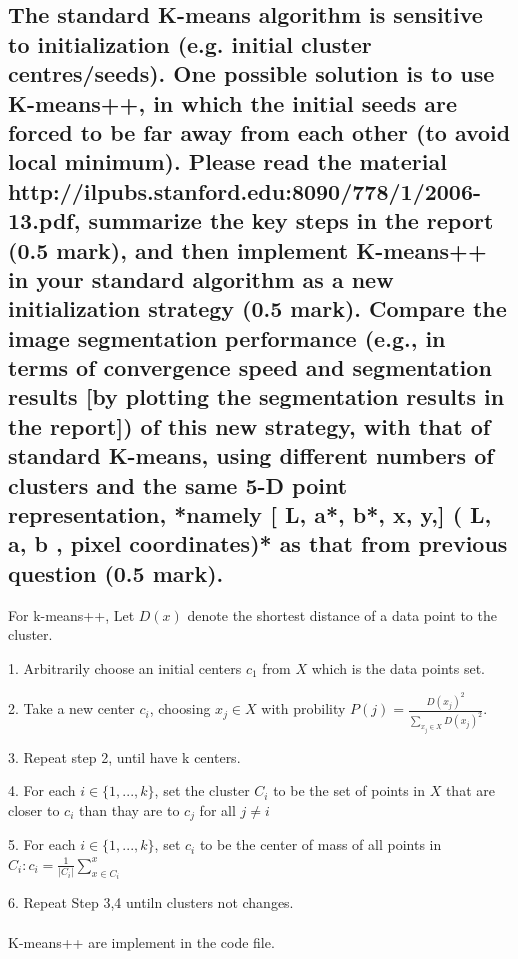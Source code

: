\documentclass[]{article}
\begin{document}
\subsection{The standard K-means algorithm is sensitive to initialization (e.g. initial cluster centres/seeds). One possible solution is to use K-means++, in which the initial seeds are forced to be far away from each other (to avoid local minimum). Please read the material http://ilpubs.stanford.edu:8090/778/1/2006-13.pdf, summarize the key steps in the report (0.5 mark), and then implement K-means++ in your standard algorithm as a new initialization strategy (0.5 mark). Compare the image segmentation performance (e.g., in terms of convergence speed and segmentation results [by plotting the segmentation results in the report]) of this new strategy, with that of standard K-means, using different numbers of clusters and the same 5-D point representation, *namely [ L, a*, b*, x, y,] ( L, a, b , pixel coordinates)* as that from previous question (0.5 mark).}
For k-means++, Let $D(x)$ denote the shortest distance of a data point to the cluster.

1. Arbitrarily choose an initial centers $c_1$ from $X$ which is the data points set.

2. Take a new center $c_i$, choosing $x_j\in X$ with probility $P(j)=\frac{D(x_j)^2}{\sum_{x_j\in X}^{}D(x_j)^2}$.

3. Repeat step 2, until have k centers.

4. For each $i\in \{1,...,k\}$, set the cluster $C_i$ to be the set of points in $X$ that are closer to $c_i$ than thay are to $c_j$ for all $j\neq i$

5. For each $i\in \{1,...,k\}$, set $c_i$ to be the center of mass of all points in $C_i: c_i = \frac{1}{|C_i|}\sum_{x\in C_i}^{x}$

6. Repeat Step 3,4 untiln clusters not changes.
\\ \hspace*{\fill} \\
K-means++ are implement in the code file.
\end{document}

